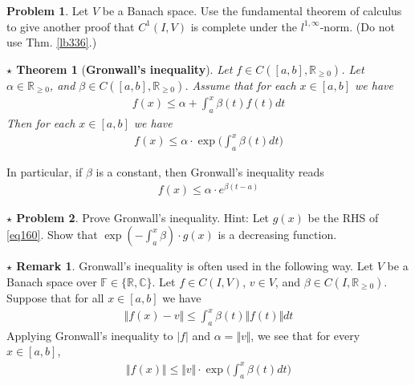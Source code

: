 \documentclass[12pt,b5paper,notitlepage]{article}
\theoremstyle{definition}
\newtheorem{srem}[df]{$\star$ Remark}
\newtheorem{prob}{\color{red}Problem}[section]
\newtheorem{sprob}[prob]{\color{red}$\star$ Problem}
\theoremstyle{plain}
\newtheorem{sthm}[df]{$\star$ Theorem}
\newcommand{\fk}{\mathfrak}
\newcommand{\Cbb}{\mathbb C}
\newcommand{\Rbb}{\mathbb R}
\newcommand{\Fbb}{\mathbb F}
\numberwithin{equation}{section}
\begin{document}
\begin{comment}
\begin{proof}[Hint]
To find $\int_0^1f$, for each $y\in\Rbb$, define $\varphi_y:V\rightarrow\Rbb$ by $\varphi_y(f)=f(y)$. Then $\varphi_y\in\fk L(V,\Rbb)$. Use $\varphi_y(\int_0^1f)=\int_0^1\varphi_y(f)$ to calculate $\int_0^1f$.
\end{proof}
\end{comment}



\begin{prob}
Let $V$ be a Banach space. Use the fundamental theorem of calculus to give another proof that $C^1(I,V)$ is complete under the $l^{1,\infty}$-norm. (Do not use Thm. \ref{lb336}.)
\end{prob}





\begin{sthm}[\textbf{Gronwall's inequality}] 
Let $f\in C([a,b],\Rbb_{\geq0})$. Let $\alpha\in\Rbb_{\geq0}$, and $\beta\in C([a,b],\Rbb_{\geq0})$. Assume that for each $x\in[a,b]$ we have
\begin{align}
f(x)\leq  \alpha+\int_a^x\beta(t)f(t) dt  \label{eq160}
\end{align}
Then for each $x\in[a,b]$ we have
\begin{align}
f(x)\leq \alpha\cdot  \exp\Big(\int_a^x \beta(t)dt \Big)
\end{align}
\end{sthm}
In particular, if $\beta$ is a constant, then Gronwall's inequality reads
\begin{align*}
f(x)\leq\alpha\cdot e^{\beta (t-a)}
\end{align*}

\begin{sprob}
Prove Gronwall's inequality. Hint: Let $g(x)$ be the RHS of \eqref{eq160}. Show that $\exp(-\int_a^x\beta)\cdot g(x)$ is a decreasing function.
\end{sprob}

\begin{srem}
Gronwall's inequality is often used in the following way. Let $V$ be a Banach space over $\Fbb\in\{\Rbb,\Cbb\}$. Let $f\in C(I,V)$, $v\in V$, and $\beta\in C(I,\Rbb_{\geq0})$. Suppose that for all $x\in[a,b]$ we have
\begin{align}
\Vert f(x)-v\Vert\leq\int_a^x\beta(t)\Vert f(t)\Vert dt
\end{align}
Applying Gronwall's inequality to $|f|$ and $\alpha=\Vert v\Vert$, we see that for every $x\in[a,b]$,
\begin{align}
\Vert f(x)\Vert\leq \Vert v\Vert\cdot  \exp\Big(\int_a^x \beta(t)dt \Big)
\end{align}
\end{srem}
\end{document}

